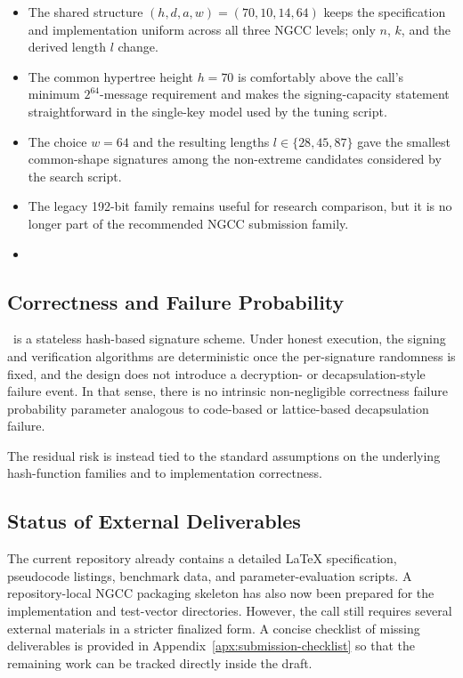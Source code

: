 \begin{itemize}
    \item The shared structure $(h,d,a,w)=(70,10,14,64)$ keeps the specification and implementation uniform across all three NGCC levels; only $n$, $k$, and the derived \WOTSCS length $l$ change.
    \item The common hypertree height $h=70$ is comfortably above the call's minimum $2^{64}$-message requirement and makes the signing-capacity statement straightforward in the single-key model used by the tuning script.
    \item The choice $w=64$ and the resulting \WOTSCS lengths $l \in \{28,45,87\}$ gave the smallest common-shape signatures among the non-extreme candidates considered by the search script.
    \item The legacy 192-bit family remains useful for research comparison, but it is no longer part of the recommended NGCC submission family.
    \item {}
\end{itemize}

\subsection{Correctness and Failure Probability}

\SPHINCSA\ is a stateless hash-based signature scheme. Under honest execution, the signing and verification algorithms are deterministic once the per-signature randomness is fixed, and the design does not introduce a decryption- or decapsulation-style failure event. In that sense, there is no intrinsic non-negligible correctness failure probability parameter analogous to code-based or lattice-based decapsulation failure.

The residual risk is instead tied to the standard assumptions on the underlying hash-function families and to implementation correctness. 

\subsection{Status of External Deliverables}

The current repository already contains a detailed LaTeX specification, pseudocode listings, benchmark data, and parameter-evaluation scripts. A repository-local NGCC packaging skeleton has also now been prepared for the implementation and test-vector directories. However, the call still requires several external materials in a stricter finalized form. A concise checklist of missing deliverables is provided in Appendix~\ref{apx:submission-checklist} so that the remaining work can be tracked directly inside the draft.
